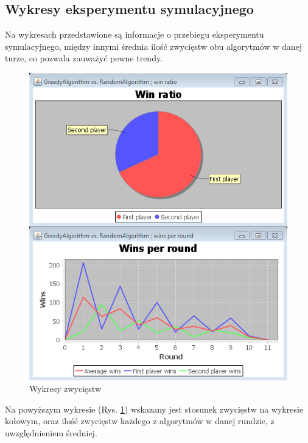 \subsection*{Wykresy eksperymentu symulacyjnego}
Na wykresach przedstawione są informacje o przebiegu eksperymentu symulacyjnego, między innymi średnia ilość zwycięstw obu algorytmów w danej turze, co pozwala zauważyć pewne trendy.
\begin{figure}[H]
	\centering
	\includegraphics[]{Resources/winCharts.PNG}
	\caption{Wykresy zwycięstw} 
	\label{fig:winChart}
\end{figure}

Na powyższym wykresie (Rys. \ref{fig:winChart}) wskazany jest stosunek zwycięstw na wykresie kołowym, oraz ilość zwycięstw każdego z algorytmów w danej rundzie, z uwzględnieniem średniej.

